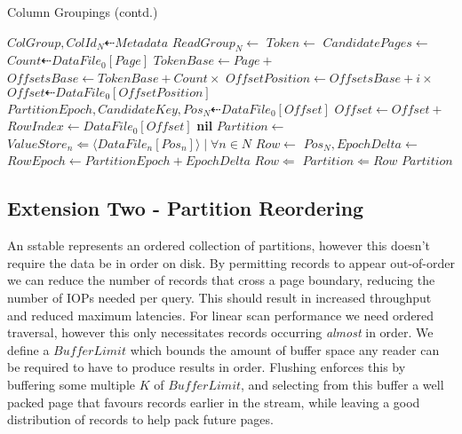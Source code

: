 \documentclass[fleqn]{article}
\begin{document}
\begin{algorithm}
\setcounter{algorithm}{2}
\scriptsize
\caption{Column Groupings (contd.)}
\begin{algorithmic}[1]
\State $ColGroup, ColId_N \dashleftarrow Metadata$
\State $ReadGroup_N \gets $ 
\State $Token \gets $ 
\State $CandidatePages \gets $
 \State $Count \dashleftarrow DataFile_{0}[Page]$
 \State $TokenBase \gets Page +  $ 
 \State $OffsetsBase \gets TokenBase + Count \times $
 \For{$i \gets $ \Call{Find}{$DataFile_0[TokenBase \dots OffsetBase), Token$}}
  \State $OffsetPosition \gets OffsetsBase + i \times $ 
  \State $Offset \dashleftarrow DataFile_{0}[OffsetPosition]$
  \State $PartitionEpoch, CandidateKey, Pos_N \dashleftarrow DataFile_{0}[Offset]$
   \State $Offset \gets Offset + $ 
   \State $RowIndex \gets DataFile_0[Offset]$
   \State \Return {}
  \EndIf
 \EndFor
\EndFor
\Return \textbf{nil}
\EndFunction
\Statex
{}
\State $Partition \gets $ 
\State $ValueStore_n \Leftarrow \langle DataFile_n[Pos_n] \rangle \mid \forall n \in N$
 \State $Row \gets $ 
 \State $Pos_N, EpochDelta \gets$ 
 \State $RowEpoch \gets PartitionEpoch + EpochDelta$
  \State $Row \Leftarrow $ 
 \EndFor
 \State $Partition \Leftarrow Row$
\EndFor
\Return $Partition$
\EndFunction
\end{algorithmic}
\end{algorithm}

\clearpage
\subsection{Extension Two - Partition Reordering}
\small
    An sstable represents an ordered collection of partitions, however this doesn't
    require the data be in order on disk. By permitting records to appear out-of-order
    we can reduce the number of records that cross a page boundary, reducing the number of IOPs 
    needed per query. This should result in increased throughput and reduced maximum latencies. 
    For linear scan performance we need ordered traversal, however this only necessitates
    records occurring \emph{almost} in order. We define a $BufferLimit$ which bounds the amount 
    of buffer space any reader can be required to have to produce results in order.
    Flushing enforces this by buffering some multiple $K$ of $BufferLimit$, and selecting 
    from this buffer a well packed page that favours records earlier in the stream, while leaving a 
    good distribution of records to help pack future pages.
\end{document}
